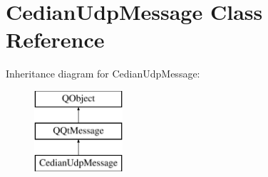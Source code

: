 \hypertarget{class_cedian_udp_message}{}\section{Cedian\+Udp\+Message Class Reference}
\label{class_cedian_udp_message}
Inheritance diagram for Cedian\+Udp\+Message\+:\begin{figure}[H]
\begin{center}
\leavevmode
\includegraphics[height=3.000000cm]{class_cedian_udp_message}
\end{center}
\end{figure}
